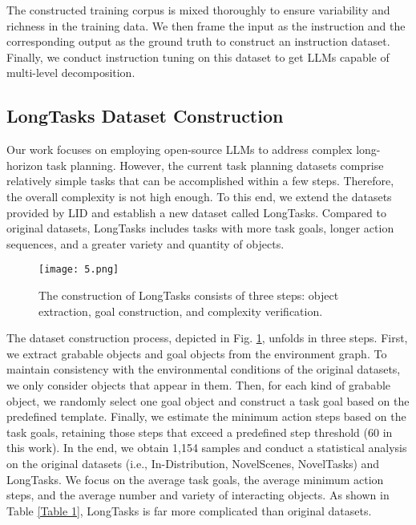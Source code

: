  The constructed training corpus is mixed thoroughly to ensure variability and richness in the training data. We then frame the input as the instruction and the corresponding output as the ground truth to construct an instruction dataset. Finally, we conduct instruction tuning on this dataset to get LLMs capable of multi-level decomposition. 

\subsection{LongTasks Dataset Construction}

Our work focuses on employing open-source LLMs to address complex long-horizon task planning. However, the current task planning datasets comprise relatively simple tasks that can be accomplished within a few steps. Therefore, the overall complexity is not high enough. To this end, we extend the datasets provided by LID \cite{DBLP:conf/nips/LiPPDWF0HAAAM0Z22} and establish a new dataset called LongTasks. Compared to original datasets, LongTasks includes tasks with more task goals, longer action sequences, and a greater variety and quantity of objects.

\begin{figure}[h]
    \centering
    \texttt{[image: 5.png]}
    \caption{The construction of LongTasks consists of three steps: object extraction, goal construction, and complexity verification.}
    \label{Figure 5}
\end{figure}

The dataset construction process, depicted in Fig. \ref{Figure 5}, unfolds in three steps. First, we extract grabable objects and goal objects from the environment graph. To maintain consistency with the environmental conditions of the original datasets, we only consider objects that appear in them. Then, for each kind of grabable object, we randomly select one goal object and construct a task goal based on the predefined template. Finally, we estimate the minimum action steps based on the task goals, retaining those steps that exceed a predefined step threshold (60 in this work). In the end, we obtain 1,154 samples and conduct a statistical analysis on the original datasets (i.e., In-Distribution, NovelScenes, NovelTasks) and LongTasks. We focus on the average task goals, the average minimum action steps, and the average number and variety of interacting objects. As shown in Table \ref{Table 1}, LongTasks is far more complicated than original datasets.

